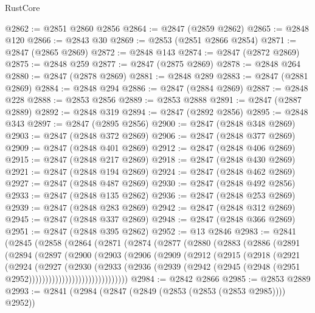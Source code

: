 \begin{lexlean}{RustCore}
\begin{coremodule}
@2862 := @2851 @2860 @2856
@2864 := @2847 (@2859 @2862)
@2865 := @2848 @120
@2866 := @2843 @30
@2869 := @2853 (@2851 @2866 @2854)
@2871 := @2847 (@2865 @2869)
@2872 := @2848 @143
@2874 := @2847 (@2872 @2869)
@2875 := @2848 @259
@2877 := @2847 (@2875 @2869)
@2878 := @2848 @264
@2880 := @2847 (@2878 @2869)
@2881 := @2848 @289
@2883 := @2847 (@2881 @2869)
@2884 := @2848 @294
@2886 := @2847 (@2884 @2869)
@2887 := @2848 @228
@2888 := @2853 @2856
@2889 := @2853 @2888
@2891 := @2847 (@2887 @2889)
@2892 := @2848 @319
@2894 := @2847 (@2892 @2856)
@2895 := @2848 @343
@2897 := @2847 (@2895 @2856)
@2900 := @2847 (@2848 @348 @2869)
@2903 := @2847 (@2848 @372 @2869)
@2906 := @2847 (@2848 @377 @2869)
@2909 := @2847 (@2848 @401 @2869)
@2912 := @2847 (@2848 @406 @2869)
@2915 := @2847 (@2848 @217 @2869)
@2918 := @2847 (@2848 @430 @2869)
@2921 := @2847 (@2848 @194 @2869)
@2924 := @2847 (@2848 @462 @2869)
@2927 := @2847 (@2848 @487 @2869)
@2930 := @2847 (@2848 @492 @2856)
@2933 := @2847 (@2848 @135 @2862)
@2936 := @2847 (@2848 @253 @2869)
@2939 := @2847 (@2848 @283 @2869)
@2942 := @2847 (@2848 @312 @2869)
@2945 := @2847 (@2848 @337 @2869)
@2948 := @2847 (@2848 @366 @2869)
@2951 := @2847 (@2848 @395 @2862)
@2952 := @13 @2846
@2983 := @2841
    (@2845
      (@2858
        (@2864
          (@2871
            (@2874
              (@2877
                (@2880
                  (@2883
                    (@2886
                      (@2891
                        (@2894
                          (@2897
                            (@2900
                              (@2903
                                (@2906
                                  (@2909
                                    (@2912
                                      (@2915
                                        (@2918
                                          (@2921
                                            (@2924
                                              (@2927
                                                (@2930
                                                  (@2933
                                                    (@2936
                                                      (@2939
                                                        (@2942
                                                          (@2945
                                                            (@2948
                                                              (@2951
                                                                @2952))))))))))))))))))))))))))))))
@2984 := @2842 @2866
@2985 := @2853 @2889
@2993 := @2841 (@2984 (@2847 (@2849 (@2853 (@2853 (@2853 @2985)))) @2952))

\end{coremodule}
\end{lexlean}
